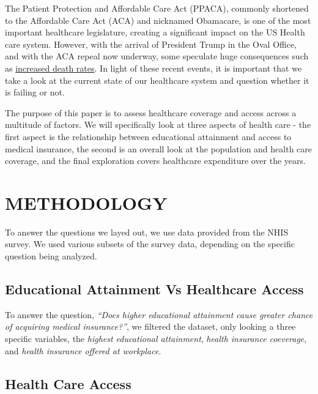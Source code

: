 \documentclass[10pt,]{article}
\begin{document}
The Patient Protection and Affordable Care Act (PPACA), commonly
shortened to the Affordable Care Act (ACA) and nicknamed Obamacare, is
one of the most important healthcare legislature, creating a significant
impact on the US Health care system. However, with the arrival of
President Trump in the Oval Office, and with the ACA repeal now
underway, some speculate huge consequences such as
\href{https://www.washingtonpost.com/posteverything/wp/2017/01/23/repealing-the-affordable-care-act-will-kill-more-than-43000-people-annually/?utm_term=.a2fbb24cd075}{increased
death rates}. In light of these recent events, it is important that we
take a look at the current state of our healthcare system and question
whether it is failing or not.

The purpose of this paper is to assess healthcare coverage and access
across a multitude of factors. We will specifically look at three
aspects of health care - the first aspect is the relationship between
educational attainment and access to medical insurance, the second is an
overall look at the population and health care coverage, and the final
exploration covers healthcare expenditure over the years.

\section{METHODOLOGY}\label{methodology}

To answer the questions we layed out, we use data provided from the NHIS
survey. We used various subsets of the survey data, depending on the
specific question being analyzed.

\subsection{\texorpdfstring{\textbf{Educational Attainment Vs Healthcare
Access}}{Educational Attainment Vs Healthcare Access}}\label{educational-attainment-vs-healthcare-access}

To answer the question, \emph{``Does higher educational attainment cause
greater chance of acquiring medical insurance?''}, we filtered the
dataset, only looking a three specific variables, the \emph{highest
educational attainment}, \emph{health insurance coeverage}, and
\emph{health insurance offered at workplace}.

\subsection{\texorpdfstring{\textbf{Health Care
Access}}{Health Care Access}}\label{health-care-access}
\end{document}
